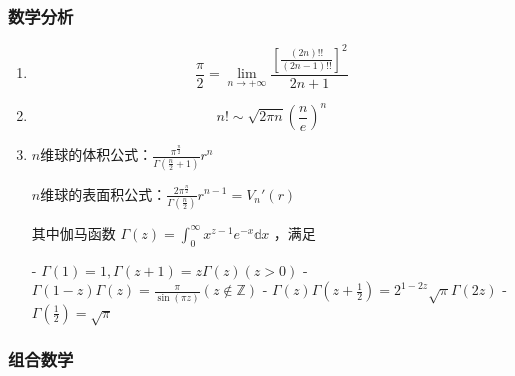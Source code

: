 \subsubsection{数学分析}

\begin{enumerate}

\item

$$
\frac{\pi}{2} = \lim_{n \to +\infty}\frac{[\frac{(2n)!!}{(2n-1)!!}]^{2}}{2n+1}
$$

\item

$$
n!\sim\sqrt{2\pi n}(\frac{n}{e})^{n}
$$

\item $n$维球的体积公式：$\displaystyle{\frac{\pi^{\frac{n}{2}}}{\Gamma(\frac{n}{2}+1)}r^{n}}$

$n$维球的表面积公式：$\displaystyle{\frac{2\pi^{\frac{n}{2}}}{\Gamma(\frac{n}{2})}r^{n-1}=V_{n}'(r)}$

其中伽马函数 $\Gamma(z)=\int_{0}^{\infty}x^{z-1}e^{-x}\mathbb{d}x$ ，满足

 - $\Gamma(1)=1,\Gamma(z+1)=z\Gamma(z)(z>0)$
 - $\Gamma(1-z)\Gamma(z)=\frac{\pi}{\sin(\pi z)}(z\notin\mathbb{Z})$
 - $\Gamma(z)\Gamma(z+\frac{1}{2})=2^{1-2z}\sqrt{\pi}\Gamma(2z)$
 - $\Gamma(\frac{1}{2})=\sqrt{\pi}$

\end{enumerate}

\subsubsection{组合数学}

